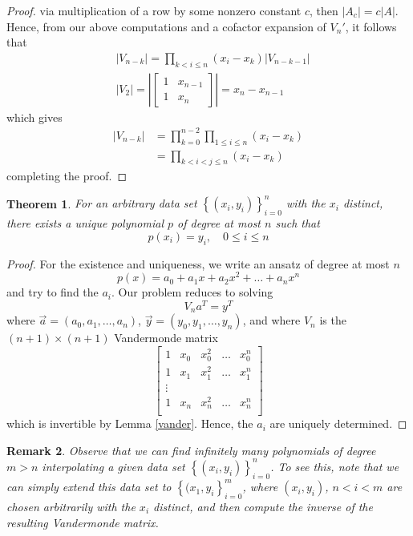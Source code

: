 \documentclass[12pt,reqno]{amsart}
\numberwithin{equation}{section}  %
\newtheorem{theorem}{Theorem}[section]
\newtheorem{remark}[theorem]{Remark}
\begin{document}
\begin{proof}
via multiplication of a row by some nonzero constant $c$, then
$|A_c| = c |A|$. Hence, from our above computations and a cofactor expansion
of $V_n'$, it follows that 
\begin{align*}
& |V_{n-k}| = \prod_{k < i \le n} (x_i - x_k) |V_{n-k-1}|\\
& | V_2 | = \left |
\begin{bmatrix}
1 & x_{n-1} \\
1 & x_{n}
\end{bmatrix}
\right | = x_n - x_{n-1}
\end{align*}
which gives
\begin{align*}
|V_{n-k}| & = \prod_{k=0}^{n-2} \prod_{1 \le i \le n} (x_i - x_k)\\
& = \prod_{k < i < j \le n} (x_i - x_k)
\end{align*}
completing the proof.
\end{proof}
\begin{theorem}
For an arbitrary data set $ \left\{ (x_i, y_i) \right\}_{i = 0}^{n}$ with the $x_i$
distinct, there
exists a unique polynomial $p$ of degree at most $n$ such that
\begin{equation*}
p(x_i) = y_i, \quad 0 \le i \le n
\end{equation*}
\end{theorem}
\begin{proof}
For the existence and uniqueness, we write an ansatz of degree at most $n$
\begin{equation*}
p(x) = a_0 + a_1x + a_2x^2 + \ldots + a_nx^n
\end{equation*}
and try to find the $a_i$. 
Our problem reduces to solving
\begin{equation*}
V_n a^{T} = y^{T}
\end{equation*}
where $\vec{a} = (a_0, a_1, \ldots, a_n)$, $\vec{y} = (y_0, y_1, \ldots, y_n)$,
and where $V_n$ is the $(n+1) \times (n+1)$ Vandermonde matrix
\begin{equation*}
\begin{bmatrix}
1 & x_0 & x_0^{2} & \ldots & x_0^{n} \\
1 & x_1 & x_1^{2} & \ldots & x_1^{n} \\
\vdots \\
1 & x_n & x_n^{2} & \ldots & x_n^{n} \\
\end{bmatrix}
\end{equation*}
which is invertible by Lemma \ref{vander}. Hence, the $a_i$ are uniquely determined.
\end{proof}
\begin{remark}
Observe that we can find infinitely many polynomials of degree $m > n$
interpolating a given data set $\left\{ (x_i, y_i) \right\}_{i=0}^n$. To see
this, note that we can simply extend this data set to $ \left\{ (x_1, y_i
\right\}_{i=0}^m$, where $(x_i, y_i)$, $n < i < m$ are chosen arbitrarily with
the $x_i$ distinct, and then compute the inverse of the resulting Vandermonde
matrix.
\end{remark}
\end{document}
